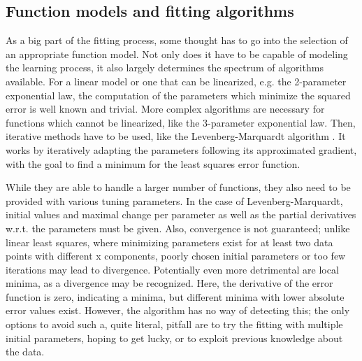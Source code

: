 \subsection{Function models and fitting algorithms}
As a big part of the fitting process, some thought has to go into the selection of an appropriate function model. Not only does it have to be capable of modeling the learning process, it also largely determines the spectrum of algorithms available. For a linear model or one that can be linearized, e.g. the 2-parameter exponential law, the computation of the parameters which minimize the squared error is well known and trivial. More complex algorithms are necessary for functions which cannot be linearized, like the 3-parameter exponential law. Then, iterative methods have to be used, like the Levenberg-Marquardt algorithm \cite{Levenberg1944}. It works by iteratively adapting the parameters following its approximated gradient, with the goal to find a minimum for the least squares error function.

While they are able to handle a larger number of functions, they also need to be provided with various tuning parameters. In the case of Levenberg-Marquardt, initial values and maximal change per parameter as well as the partial derivatives w.r.t. the parameters must be given. Also, convergence is not guaranteed; unlike linear least squares, where minimizing parameters exist for at least two data points with different x components, poorly chosen initial parameters or too few iterations may lead to divergence. Potentially even more detrimental are local minima, as a divergence may be recognized. Here, the derivative of the error function is zero, indicating a minima, but different minima with lower absolute error values exist. However, the algorithm has no way of detecting this; the only options to avoid such a, quite literal, pitfall are to try the fitting with multiple initial parameters, hoping to get lucky, or to exploit previous knowledge about the data.

